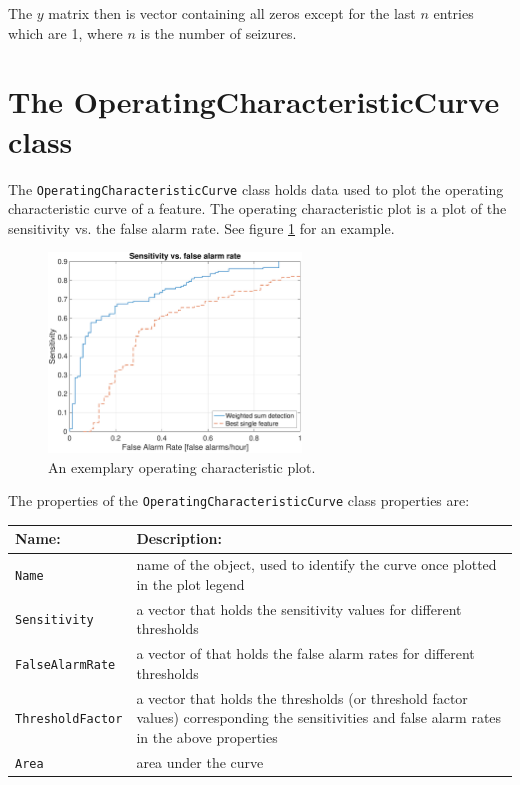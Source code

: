 \documentclass[usletter, 11pt]{extarticle}
\begin{document}
The $y$ matrix then is vector containing all zeros except for the last $n$ entries which are 1, where $n$ is the number of seizures.



\clearpage
\section{The OperatingCharacteristicCurve class} \label{sec:roc}

The \verb|OperatingCharacteristicCurve| class holds data used to plot the operating characteristic curve of a feature. The operating characteristic plot is a plot of the sensitivity vs. the false alarm rate. See figure \ref{fig:roc} for an example.  

\begin{figure}[!h]
	\centering
	\includegraphics[width = 0.6\textwidth]{img/characteristic_curve}
	\caption{An exemplary operating characteristic plot.}
	\label{fig:roc}
\end{figure}

The properties of the \verb|OperatingCharacteristicCurve| class  properties are:

\begin{center}
	\begin{longtable}{p{5cm}|p{12cm}}
	\textbf{Name:} & \textbf{Description:} \\ \hline
	\verb|Name| & name of the object, used to identify the curve once plotted in the plot legend \\
	\verb|Sensitivity| & a vector that holds the sensitivity values for different thresholds \\
	\verb|FalseAlarmRate| & a vector of that holds the false alarm rates for different thresholds \\
	\verb|ThresholdFactor| & a vector that holds the thresholds (or threshold factor values) corresponding the sensitivities and false alarm rates in the above properties \\
	\verb|Area| & area under the curve 
	\end{longtable}
\end{center}
\end{document}
